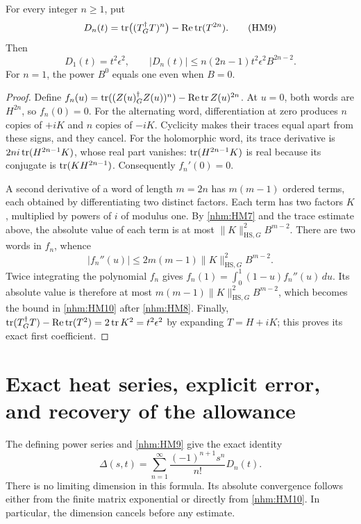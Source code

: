 \begin{nhmlemma}
For every integer \(n\ge1\), put
\begin{equation}
 D_n(t)=\operatorname{tr}\bigl((T^\dagger_G T)^n\bigr)-\operatorname{Re}\operatorname{tr}(T^{2n}).
 \tag{HM9}\label{nhm:HM9}
\end{equation}
Then
\begin{equation}
 D_1(t)=t^2\epsilon^2,\qquad
 |D_n(t)|\le n(2n-1)t^2\epsilon^2 B^{2n-2}.
 \tag{HM10}\label{nhm:HM10}
\end{equation}
For \(n=1\), the power \(B^0\) equals one even when \(B=0\).
\end{nhmlemma}
\begin{proof}
Define
\(f_n(u)=\operatorname{tr}((Z(u)^\dagger_G Z(u))^n)-\operatorname{Re}\operatorname{tr} Z(u)^{2n}\).
At \(u=0\), both words are \(H^{2n}\), so \(f_n(0)=0\).
For the alternating word, differentiation at zero produces \(n\) copies
of \(+iK\) and \(n\) copies of \(-iK\). Cyclicity makes their traces equal
apart from these signs, and they cancel. For the holomorphic word, its trace
derivative is \(2ni\operatorname{tr}(H^{2n-1}K)\), whose real part vanishes:
\(\operatorname{tr}(H^{2n-1}K)\) is real because its conjugate is
\(\operatorname{tr}(KH^{2n-1})\). Consequently \(f_n'(0)=0\).

A second derivative of a word of length \(m=2n\) has \(m(m-1)\) ordered
terms, each obtained by differentiating two distinct factors. Each term
has two factors \(K\), multiplied by powers of \(i\) of modulus one.
By \eqref{nhm:HM7} and the trace estimate above, the absolute value of each
term is at most \(\|K\|_{\mathrm{HS},G}^2B^{m-2}\).
There are two words in \(f_n\), whence
\[
 |f_n''(u)|\le2m(m-1)\|K\|_{\mathrm{HS},G}^2B^{m-2}.
\]
Twice integrating the polynomial \(f_n\) gives
\(f_n(1)=\int_0^1(1-u)f_n''(u)\,du\).
Its absolute value is therefore at most
\(m(m-1)\|K\|_{\mathrm{HS},G}^2B^{m-2}\), which becomes the bound
in \eqref{nhm:HM10} after \eqref{nhm:HM8}.
Finally,
\(\operatorname{tr}(T^\dagger_G T)-\operatorname{Re}\operatorname{tr}(T^2)=2\operatorname{tr} K^2=t^2\epsilon^2\)
by expanding \(T=H+iK\); this proves its exact first coefficient.
\end{proof}

\section{Exact heat series, explicit error, and recovery of the allowance}

The defining power series and \eqref{nhm:HM9} give the exact identity
\begin{equation}
 \Delta(s,t)=\sum_{n=1}^{\infty}
       \frac{(-1)^{n+1}s^n}{n!}D_n(t).
 \tag{HM11}\label{nhm:HM11}
\end{equation}
There is no limiting dimension in this formula. Its absolute convergence
follows either from the finite matrix exponential or directly from
\eqref{nhm:HM10}. In particular, the dimension cancels before any estimate.

